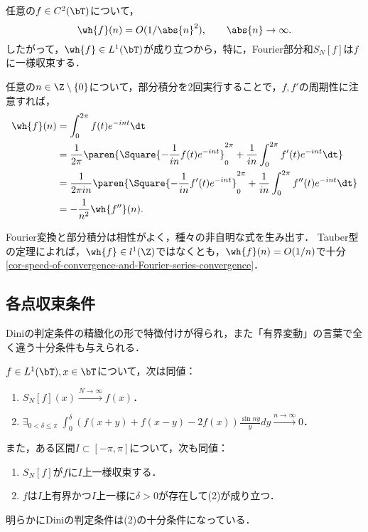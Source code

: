 \documentclass[uplatex,dvipdfmx]{jsreport}
\begin{document}
\begin{corollary}[Fourier級数が絶対収束するための条件]\label{cor-for-Fourier-series-to-absolutely-convergent}
    任意の$f\in C^2(\bT)$について，
    \[\wh{f}(n)=O(1/\abs{n}^2),\qquad\abs{n}\to\infty.\]
    したがって，$\wh{f}\in L^1(\bT)$が成り立つから，特に，Fourier部分和$S_N[f]$は$f$に一様収束する．
\end{corollary}
\begin{Proof}
    任意の$n\in\Z\setminus\{0\}$について，部分積分を2回実行することで，$f,f'$の周期性に注意すれば，
    \begin{align*}
        \wh{f}(n)&=\int^{2\pi}_0f(t)e^{-int}\dt\\
        &=\frac{1}{2\pi}\paren{\Square{-\frac{1}{in}f(t)e^{-int}}^{2\pi}_0+\frac{1}{in}\int^{2\pi}_0f'(t)e^{-int}\dt}\\
        &=\frac{1}{2\pi in}\paren{\Square{-\frac{1}{in}f'(t)e^{-int}}^{2\pi}_0+\frac{1}{in}\int^{2\pi}_0f''(t)e^{-int}\dt}\\
        &=-\frac{1}{n^2}\wh{f''}(n).
    \end{align*}
\end{Proof}
\begin{remarks}
    Fourier変換と部分積分は相性がよく，種々の非自明な式を生み出す．
    Tauber型の定理によれば，$\wh{f}\in l^1(\Z)$ではなくとも，$\wh{f}(n)=O(1/n)$で十分\ref{cor-speed-of-convergence-and-Fourier-series-convergence}．
\end{remarks}

\subsection{各点収束条件}

\begin{tcolorbox}[colframe=ForestGreen, colback=ForestGreen!10!white,breakable,colbacktitle=ForestGreen!40!white,coltitle=black,fonttitle=\bfseries\sffamily,
title=]
    Diniの判定条件の精緻化の形で特徴付けが得られ，また「有界変動」の言葉で全く違う十分条件も与えられる．
\end{tcolorbox}

\begin{theorem}[各点収束性の特徴付け]
    $f\in L^1(\bT),x\in\bT$について，次は同値：
    \begin{enumerate}
        \item $S_N[f](x)\xrightarrow{N\to\infty}f(x)$．
        \item $\exists_{0<\delta\le\pi}\;\int^\delta_0(f(x+y)+f(x-y)-2f(x))\frac{\sin ny}{y}dy\xrightarrow{n\to\infty}0$．
    \end{enumerate}
    また，ある区間$I\subset[-\pi,\pi]$について，次も同値：
    \begin{enumerate}
        \item $S_N[f]$が$f$に$I$上一様収束する．
        \item $f$は$I$上有界かつ$I$上一様に$\delta>0$が存在して(2)が成り立つ．
    \end{enumerate}
\end{theorem}
\begin{remarks}
    明らかにDiniの判定条件は(2)の十分条件になっている．
\end{remarks}
\end{document}
